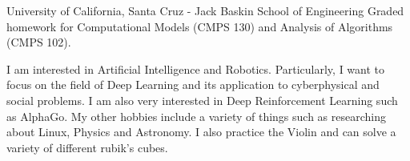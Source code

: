 \documentclass{resume}
\begin{document}
{University of California, Santa Cruz - Jack Baskin School of Engineering}
{Graded homework for Computational Models (CMPS 130) and Analysis of 
Algorithms (CMPS 102).}

I am interested in Artificial Intelligence and Robotics. Particularly,
I want to focus on the field of Deep Learning and its application to
cyberphysical and social problems. I am also very interested in 
Deep Reinforcement Learning such as AlphaGo. My other hobbies include a variety
of things such as researching about Linux, Physics and Astronomy. I
also practice the Violin and can solve a variety of different rubik's
cubes.
\end{document}
